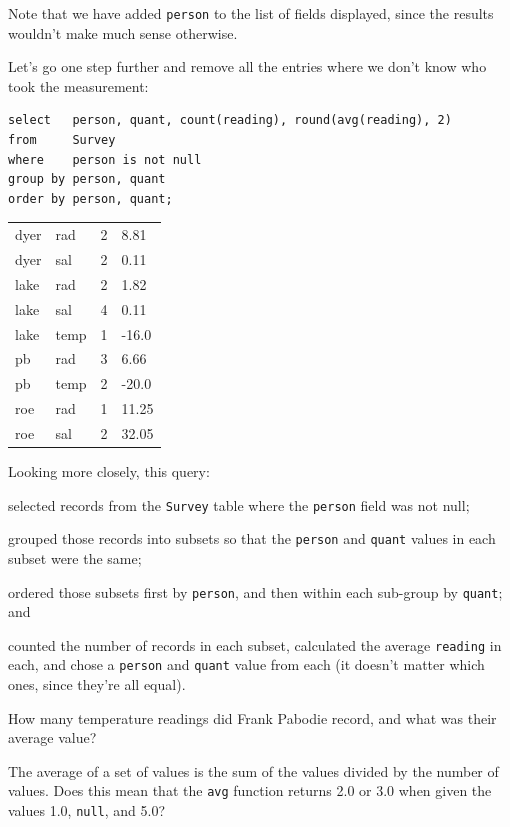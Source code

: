 \documentclass{book}
\begin{document}
Note that we have added \texttt{person} to the list of fields displayed,
since the results wouldn't make much sense otherwise.

Let's go one step further and remove all the entries where we don't know
who took the measurement:

\begin{verbatim}
select   person, quant, count(reading), round(avg(reading), 2)
from     Survey
where    person is not null
group by person, quant
order by person, quant;
\end{verbatim}

\begin{tabular}{llll}
dyer & rad & 2 & 8.81 \\
dyer & sal & 2 & 0.11 \\
lake & rad & 2 & 1.82 \\
lake & sal & 4 & 0.11 \\
lake & temp & 1 & -16.0 \\
pb & rad & 3 & 6.66 \\
pb & temp & 2 & -20.0 \\
roe & rad & 1 & 11.25 \\
roe & sal & 2 & 32.05 \\
\end{tabular}

Looking more closely, this query:

\begin{swcenumerate}
\item
  selected records from the \texttt{Survey} table where the
  \texttt{person} field was not null;
\item
  grouped those records into subsets so that the \texttt{person} and
  \texttt{quant} values in each subset were the same;
\item
  ordered those subsets first by \texttt{person}, and then within each
  sub-group by \texttt{quant}; and
\item
  counted the number of records in each subset, calculated the average
  \texttt{reading} in each, and chose a \texttt{person} and
  \texttt{quant} value from each (it doesn't matter which ones, since
  they're all equal).
\end{swcenumerate}

\begin{challenge}
  How many temperature readings did Frank Pabodie record, and what was
  their average value?
\end{challenge}

\begin{challenge}
  The average of a set of values is the sum of the values divided by the
  number of values. Does this mean that the \texttt{avg} function
  returns 2.0 or 3.0 when given the values 1.0, \texttt{null}, and 5.0?
\end{challenge}
\end{document}
